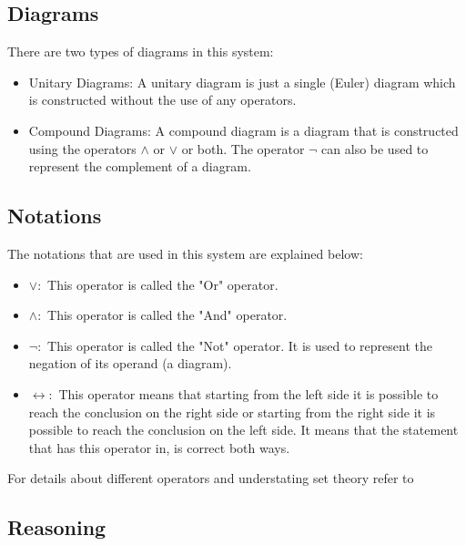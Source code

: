 \documentclass[10pt, a4paper, titlepage]{article}
\begin{document}
\subsection{Diagrams}
There are two types of diagrams in this system:
\begin{itemize}
\item Unitary Diagrams: A unitary diagram is just a single (Euler) diagram which is constructed without the use of any operators.
\item Compound Diagrams: A compound diagram is a diagram that is constructed using the operators $\wedge$ or $\vee$ or both. The operator $\neg$ can also be used to represent the complement of a diagram.
\end{itemize}


\subsection{Notations}
The notations that are used in this system are explained below:

\begin{itemize}
\item $ \vee : $ This operator is called the "Or" operator.   \\
\item $ \wedge : $ This operator is called the "And" operator.  \\
\item $ \neg : $ This operator is called the "Not" operator. It is used to represent the negation of its operand (a diagram). \\
\item $ \leftrightarrow : $ This operator means that starting from the left side it is possible to reach the conclusion on the right side or starting from the right side it is possible to reach the conclusion on the left side. It means that the statement that has this operator in, is correct both ways. \\
\end{itemize}

For details about different operators and understating set theory refer to \cite{Taylor_book}

\subsection{Reasoning}
\end{document}
